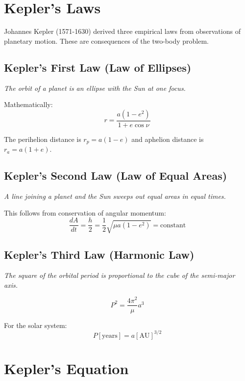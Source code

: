 \section{Kepler's Laws}

Johannes Kepler (1571-1630) derived three empirical laws from observations of planetary motion. These are consequences of the two-body problem.

\subsection{Kepler's First Law (Law of Ellipses)}

\textit{The orbit of a planet is an ellipse with the Sun at one focus.}

Mathematically:
\begin{equation}
    r = \frac{a(1-e^2)}{1 + e\cos\nu}
\end{equation}

The perihelion distance is $r_p = a(1-e)$ and aphelion distance is $r_a = a(1+e)$.

\subsection{Kepler's Second Law (Law of Equal Areas)}

\textit{A line joining a planet and the Sun sweeps out equal areas in equal times.}

This follows from conservation of angular momentum:
\begin{equation}
    \frac{dA}{dt} = \frac{h}{2} = \frac{1}{2}\sqrt{\mu a(1-e^2)} = \text{constant}
\end{equation}

\subsection{Kepler's Third Law (Harmonic Law)}

\textit{The square of the orbital period is proportional to the cube of the semi-major axis.}

\begin{equation}
    P^2 = \frac{4\pi^2}{\mu}a^3
\end{equation}

For the solar system:
\begin{equation}
    P[\text{years}] = a[\text{AU}]^{3/2}
\end{equation}

\section{Kepler's Equation}


